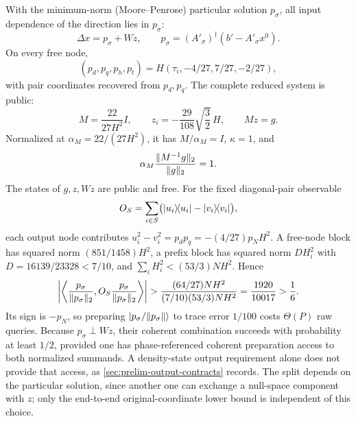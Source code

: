 With the minimum-norm (Moore--Penrose) particular solution \(p_\sigma\),
all input dependence of the direction lies in \(p_\sigma\):
\begin{equation}
 \Delta x=p_\sigma+Wz,\qquad
 p_\sigma=(A'_\sigma)^\dagger(b'-A'_\sigma x^0).
\end{equation}
On every free node,
\begin{equation}
 (p_d,p_q,p_h,p_t)=H(\tau_i,-4/27,7/27,-2/27),
\end{equation}
with pair coordinates recovered from \(p_d,p_q\).  The complete reduced
system is public:
\begin{equation}
 M=\frac{22}{27H^2}I,\qquad
 z_i=-\frac{29}{108}\sqrt{\frac32}\,H,\qquad Mz=g.
\end{equation}
Normalized at \(\alpha_M=22/(27H^2)\), it has
\(M/\alpha_M=I\), \(\kappa=1\), and
\begin{equation}
 \alpha_M\frac{\lVert M^{-1}g\rVert_2}{\lVert g\rVert_2}=1.
\end{equation}
The states of \(g,z,Wz\) are public and free.  For the fixed diagonal-pair
observable
\[
 O_S=\sum_{i\in S}
 \bigl(\lvert u_i\rangle\!\langle u_i\rvert-\lvert v_i\rangle\!\langle v_i\rvert\bigr),
\]
each output node contributes
\(u_i^2-v_i^2=p_d p_q=-(4/27)p_NH^2\).  A free-node block has squared norm
\((851/1458)H^2\), a prefix block has squared norm
\(DH_i^2\) with \(D=16139/23328<7/10\), and
\(\sum_iH_i^2<(53/3)NH^2\).  Hence
\begin{equation}
 \left|\left\langle
 \frac{p_\sigma}{\lVert p_\sigma\rVert_2},O_S
 \frac{p_\sigma}{\lVert p_\sigma\rVert_2}
 \right\rangle\right|
 >\frac{(64/27)NH^2}{(7/10)(53/3)NH^2}
 =\frac{1920}{10017}>\frac16.
\end{equation}
Its sign is \(-p_N\), so
preparing \(\lvert p_\sigma/\lVert p_\sigma\rVert\rangle\) to trace error \(1/100\)
costs \(\Theta(P)\) raw queries.  Because
\(p_\sigma\perp Wz\), their coherent combination succeeds with probability
at least \(1/2\), provided one has phase-referenced coherent preparation
access to both normalized summands.  A density-state output requirement alone does not
provide that access, as \cref{sec:prelim-output-contracts} records.  The
split depends on the particular solution, since another one can exchange a
null-space component with \(z\); only the end-to-end original-coordinate
lower bound is independent of this choice.

